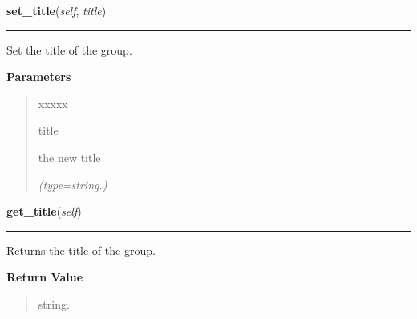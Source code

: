    \label{pygtk_chart:multi_bar_chart:BarGroup:set_title}

    \vspace{0.5ex}

\hspace{.8\funcindent}\begin{boxedminipage}{\funcwidth}

    \raggedright \textbf{set\_title}(\textit{self}, \textit{title})

    \vspace{-1.5ex}

    \rule{\textwidth}{0.5\fboxrule}
\setlength{\parskip}{2ex}
    Set the title of the group.

\setlength{\parskip}{1ex}
      \textbf{Parameters}
      \vspace{-1ex}

      \begin{quote}
        \begin{Ventry}{xxxxx}

          \item[title]

          the new title

            {\it (type=string.)}

        \end{Ventry}

      \end{quote}

    \end{boxedminipage}

    \label{pygtk_chart:multi_bar_chart:BarGroup:get_title}

    \vspace{0.5ex}

\hspace{.8\funcindent}\begin{boxedminipage}{\funcwidth}

    \raggedright \textbf{get\_title}(\textit{self})

    \vspace{-1.5ex}

    \rule{\textwidth}{0.5\fboxrule}
\setlength{\parskip}{2ex}
    Returns the title of the group.

\setlength{\parskip}{1ex}
      \textbf{Return Value}
    \vspace{-1ex}

      \begin{quote}
      string.

      \end{quote}

    \end{boxedminipage}


